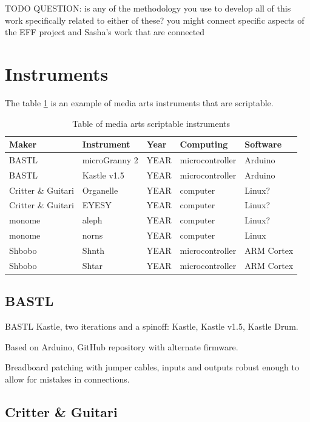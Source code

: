 TODO QUESTION: is any of the methodology you use to develop all of this work specifically related to either of these? you might connect specific aspects of the EFF project and Sasha's work that are connected


\section{Instruments}

The table \ref{table:media-arts-scriptable-instruments} is an example of media arts instruments that are scriptable.

\begin{table}[h!]
    \centering
    \begin{tabular}{ | l | l | l | l | l | }
        Maker & Instrument & Year & Computing & Software \\ 
        \hline 
        BASTL & microGranny 2 & YEAR & microcontroller & Arduino \\
        BASTL & Kastle v1.5 & YEAR &microcontroller  & Arduino \\
        Critter \& Guitari & Organelle & YEAR & computer & Linux? \\
        Critter \& Guitari & EYESY & YEAR & computer & Linux? \\
        monome & aleph & YEAR & computer & Linux? \\
        monome & norns & YEAR & computer & Linux \\
        Shbobo & Shnth & YEAR & microcontroller & ARM Cortex \\
        Shbobo & Shtar & YEAR & microcontroller & ARM Cortex 
    \end{tabular}
    \caption{Table of media arts scriptable instruments}
    \label{table:media-arts-scriptable-instruments}
\end{table}


\subsection{BASTL}

BASTL Kastle, two iterations and a spinoff: Kastle, Kastle v1.5, Kastle Drum. 

Based on Arduino, GitHub repository with alternate firmware.

Breadboard patching with jumper cables, inputs and outputs robust enough to allow for mistakes in connections.

\subsection{Critter \& Guitari}

